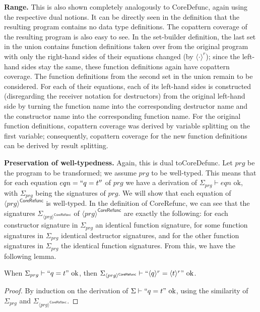 \textbf{Range.} This is also shown completely analogously to \textsf{CoreDefunc}, again using the respective dual notions. It can be directly seen in the definition that the resulting program contains no data type definitions. The copattern coverage of the resulting program is also easy to see. In the set-builder definition, the last set in the union contains function definitions taken over from the original program with only the right-hand sides of their equations changed (by $\langle \cdot \rangle^r$); since the left-hand sides stay the same, these function definitions again have copattern coverage. The function definitions from the second set in the union remain to be considered. For each of their equations, each of its left-hand sides is constructed (disregarding the receiver notation for destructors) from the original left-hand side by turning the function name into the corresponding destructor name and the constructor name into the corresponding function name. For the original function definitions, copattern coverage was derived by variable splitting on the first variable; consequently, copattern coverage for the new function definitions can be derived by result splitting.

\textbf{Preservation of well-typedness.} Again, this is dual to\textsf{CoreDefunc}. Let $prg$ be the program to be transformed; we assume $prg$ to be well-typed. This means that for each equation $eqn = `` q = t ''$ of $prg$ we have a derivation of $\Sigma_{prg} \vdash eqn \textrm{ ok}$, with $\Sigma_{prg}$ being the signatures of $prg$. We will show that each equation of $\langle prg \rangle^{\textsf{CoreRefunc}}$ is well-typed. In the definition of \textsf{CoreRefunc}, we can see that the signatures $\Sigma_{\langle prg \rangle^{\textsf{CoreRefunc}}}$ of $\langle prg \rangle^{\textsf{CoreRefunc}}$ are exactly the following: for each constructor signature in $\Sigma_{prg}$ an identical function signature, for some function signatures in $\Sigma_{prg}$ identical destructor signatures, and for the other function signatures in $\Sigma_{prg}$ the identical function signatures. From this, we have the following lemma.

\begin{lemma}
\label{lem:pwtrefunc}
When $\Sigma_{prg} \vdash `` q = t " \textrm{ ok}$, then $\Sigma_{\langle prg \rangle^{\textsf{CoreRefunc}}} \vdash `` \langle q \rangle^r = \langle t \rangle^r " \textrm{ ok}$.
\begin{proof}
By induction on the derivation of $\Sigma \vdash `` q = t " \textrm{ ok}$, using the similarity of $\Sigma_{prg}$ and $\Sigma_{\langle prg \rangle^{\textsf{CoreRefunc}}}$.
\end{proof}
\end{lemma}

